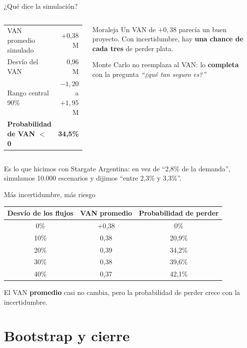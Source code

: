 \documentclass[aspectratio=169,10pt]{beamer}
\begin{document}
\begin{frame}{¿Qué dice la simulación?}
\begin{columns}[T]
\begin{center}
\begin{tabular}{lr}
\toprule
VAN promedio simulado & +0,38 M \\
Desvío del VAN & 0,96 M \\
Rango central 90\% & $-1{,}20$ a $+1{,}95$ M \\
\textbf{Probabilidad de VAN $<$ 0} & \textbf{34,5\%} \\
\bottomrule
\end{tabular}
\end{center}
\begin{alertblock}{Moraleja}
Un VAN de $+0{,}38$ parecía un buen proyecto. Con incertidumbre, hay \textbf{una chance de cada tres} de perder plata.

Monte Carlo no reemplaza al VAN: lo \textbf{completa} con la pregunta \emph{``¿qué tan seguro es?''}
\end{alertblock}
\end{columns}
\vspace{0.2cm}
\small Es lo que hicimos con Stargate Argentina: en vez de ``2,8\% de la demanda'', simulamos 10.000 escenarios y dijimos ``entre 2,3\% y 3,3\%''.
\end{frame}

\begin{frame}{Más incertidumbre, más riesgo}
\begin{center}
\begin{tabular}{ccc}
\toprule
\textbf{Desvío de los flujos} & \textbf{VAN promedio} & \textbf{Probabilidad de perder} \\
\midrule
0\% & +0,38 & 0\% \\
10\% & 0,38 & 20,9\% \\
20\% & 0,39 & 34,2\% \\
30\% & 0,38 & 39,6\% \\
40\% & 0,37 & 42,1\% \\
\bottomrule
\end{tabular}
\end{center}
El VAN \textbf{promedio} casi no cambia, pero la probabilidad de perder crece con la incertidumbre.
\end{frame}

\section{Bootstrap y cierre}
\end{document}
